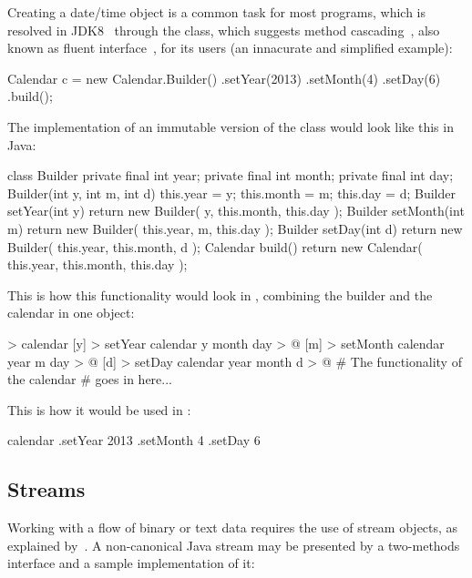 Creating a date/time object is a common task for most programs, which
is resolved in JDK8~\citep{jdk8} through the  class,
which suggests method cascading~\citep{beck1997smalltalk},
also known as fluent interface~\cite{fluentinterface}, for its users
(an innacurate and simplified example):

\begin{ffcode}
Calendar c = new Calendar.Builder()
  .setYear(2013)
  .setMonth(4)
  .setDay(6)
  .build();
\end{ffcode}

The implementation of an immutable version of the 
class would look like this in Java:

\begin{ffcode}
class Builder {
  private final int year;
  private final int month;
  private final int day;
  Builder(int y, int m, int d) {
    this.year = y;
    this.month = m;
    this.day = d;
  }
  Builder setYear(int y) {
    return new Builder(
      y, this.month, this.day
    );
  }
  Builder setMonth(int m) {
    return new Builder(
      this.year, m, this.day
    );
  }
  Builder setDay(int d) {
    return new Builder(
      this.year, this.month, d
    );
  }
  Calendar build() {
    return new Calendar(
      this.year, this.month, this.day
    );
  }
}
\end{ffcode}

This is how this functionality would look in \eo{}, combining
the builder and the calendar in one object:

\begin{ffcode}
 > calendar
  [y] > setYear
    calendar y month day > @
  [m] > setMonth
    calendar year m day > @
  [d] > setDay
    calendar year month d > @
  # The functionality of the calendar
  # goes in here...
\end{ffcode}

This is how it would be used in \eo{}:

\begin{ffcode}
calendar
.setYear 2013
.setMonth 4
.setDay 6
\end{ffcode}

\subsection{Streams}

Working with a flow of binary or text data requires the use
of stream objects, as explained by~\citet[p.226]{metsker2002}.
A non-canonical Java stream may be presented by
a two-methods interface and a sample implementation of it:

